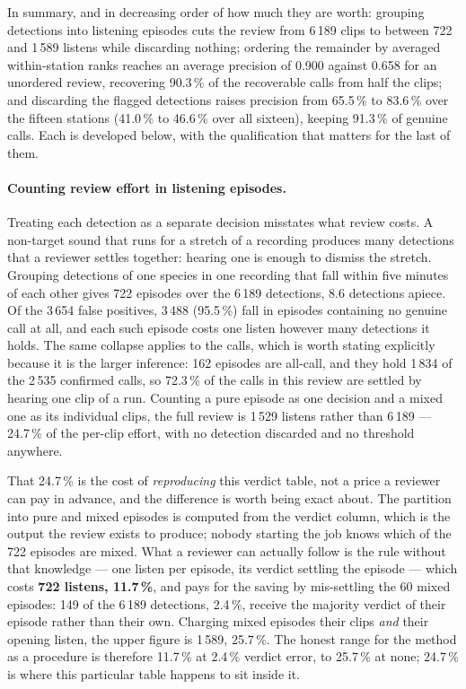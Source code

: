 \documentclass[review,3p,times]{elsarticle}
\begin{document}
In summary, and in decreasing order of how much they are worth: grouping
detections into listening episodes cuts the review from 6\,189 clips to between
722 and 1\,589 listens while discarding nothing; ordering the remainder by averaged
within-station ranks reaches an average precision of 0.900 against 0.658 for an
unordered review, recovering 90.3\,\% of the recoverable calls from half the
clips; and discarding the flagged detections raises precision from 65.5\,\% to
83.6\,\% over the fifteen stations (41.0\,\% to 46.6\,\% over all sixteen),
keeping 91.3\,\% of genuine calls. Each is developed below, with the
qualification that matters for the last of them.

\paragraph{Counting review effort in listening episodes.}
Treating each detection as a separate decision misstates what review costs. A
non-target sound that runs for a stretch of a recording produces many
detections that a reviewer settles together: hearing one is enough to dismiss
the stretch. Grouping detections of one species in one recording that fall
within five minutes of each other gives 722 episodes over the 6\,189
detections, 8.6 detections apiece. Of the 3\,654 false positives, 3\,488
(95.5\,\%) fall in episodes containing no genuine call at all, and each such
episode costs one listen however many detections it holds. The same collapse
applies to the calls, which is worth stating explicitly because it is the larger
inference: 162 episodes are all-call, and they hold 1\,834 of the 2\,535
confirmed calls, so 72.3\,\% of the calls in this review are settled by hearing
one clip of a run. Counting a pure episode as one decision and a mixed one as
its individual clips, the full review is 1\,529 listens rather than 6\,189 ---
24.7\,\% of the per-clip effort, with no detection discarded and no threshold
anywhere.

That 24.7\,\% is the cost of \emph{reproducing} this verdict table, not a price
a reviewer can pay in advance, and the difference is worth being exact about.
The partition into pure and mixed episodes is computed from the verdict column,
which is the output the review exists to produce; nobody starting the job knows
which of the 722 episodes are mixed. What a reviewer can actually follow is the
rule without that knowledge --- one listen per episode, its verdict settling the
episode --- which costs \textbf{722 listens, 11.7\,\%}, and pays for the saving
by mis-settling the 60 mixed episodes: 149 of the 6\,189 detections, 2.4\,\%,
receive the majority verdict of their episode rather than their own. Charging
mixed episodes their clips \emph{and} their opening listen, the upper figure is
1\,589, 25.7\,\%. The honest range for the method as a procedure is therefore
11.7\,\% at 2.4\,\% verdict error, to 25.7\,\% at none; 24.7\,\% is where this
particular table happens to sit inside it.
\end{document}
